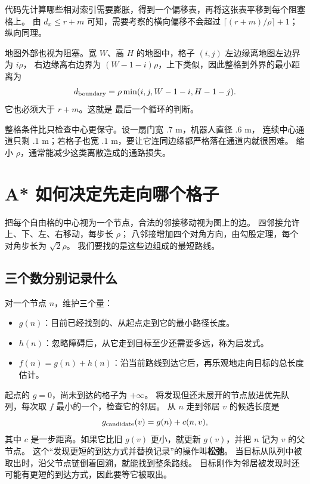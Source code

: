 代码先计算哪些相对索引需要膨胀，得到一个偏移表，再将这张表平移到每个阻塞格上。
由 $d_x\leq r+m$ 可知，需要考察的横向偏移不会超过
$\lceil(r+m)/\rho\rceil+1$；纵向同理。
\par\noindent\begin{minipage}{\linewidth}

\end{minipage}\par
地图外部也视为阻塞。宽 $W$、高 $H$ 的地图中，格子 $(i,j)$ 左边缘离地图左边界为 $i\rho$，
右边缘离右边界为 $(W-1-i)\rho$，上下类似，因此整格到外界的最小距离为
\begin{equation}
d_{\rm boundary}=\rho\min(i,j,W-1-i,H-1-j).
\end{equation}
它也必须大于 $r+m$。这就是  最后一个循环的判断。

整格条件比只检查中心更保守。设一扇门宽 $.7$ m，机器人直径 $.6$ m，
连续中心通道只剩 $.1$ m；若格子也宽 $.1$ m，要让它连同边缘都严格落在通道内就很困难。
缩小 $\rho$，通常能减少这类离散造成的通路损失。

\section{A* 如何决定先走向哪个格子}
把每个自由格的中心视为一个节点，合法的邻接移动视为图上的边。
四邻接允许上、下、左、右移动，每步长 $\rho$；
八邻接增加四个对角方向，由勾股定理，每个对角步长为 $\sqrt2\rho$。
我们要找的是这些边组成的最短路线。

\subsection{三个数分别记录什么}
对一个节点 $n$，维护三个量：
\begin{itemize}
\item $g(n)$：目前已经找到的、从起点走到它的最小路径长度。
\item $h(n)$：忽略障碍后，从它走到目标至少还需要多远，称为启发式。
\item $f(n)=g(n)+h(n)$：沿当前路线到达它后，再乐观地走向目标的总长度估计。
\end{itemize}
起点的 $g=0$，尚未到达的格子为 $+\infty$。
将发现但还未展开的节点放进优先队列，每次取 $f$ 最小的一个，检查它的邻居。
从 $n$ 走到邻居 $v$ 的候选长度是
\begin{equation}
g_{\rm candidate}(v)=g(n)+c(n,v),
\end{equation}
其中 $c$ 是一步距离。如果它比旧 $g(v)$ 更小，就更新 $g(v)$，并把 $n$ 记为 $v$ 的父节点。
这个“发现更短的到达方式并替换记录”的操作叫\textbf{松弛}。
当目标从队列中被取出时，沿父节点链倒着回溯，就能找到整条路线。
目标刚作为邻居被发现时还可能有更短的到达方式，因此要等它被取出。

